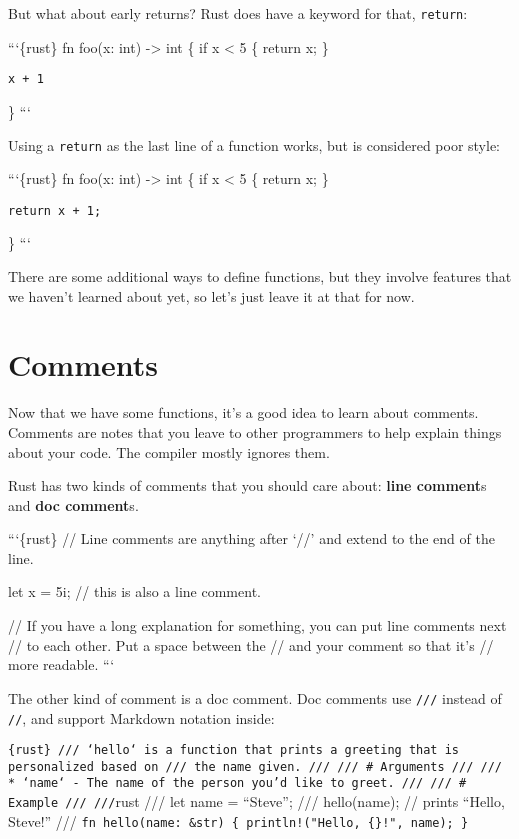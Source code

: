 \documentclass[]{article}
\begin{document}
But what about early returns? Rust does have a keyword for that,
\texttt{return}:

```\{rust\} fn foo(x: int) -\textgreater{} int \{ if x \textless{} 5 \{
return x; \}

\begin{verbatim}
x + 1
\end{verbatim}

\} ```

Using a \texttt{return} as the last line of a function works, but is
considered poor style:

```\{rust\} fn foo(x: int) -\textgreater{} int \{ if x \textless{} 5 \{
return x; \}

\begin{verbatim}
return x + 1;
\end{verbatim}

\} ```

There are some additional ways to define functions, but they involve
features that we haven't learned about yet, so let's just leave it at
that for now.

\section{Comments}\label{comments}

Now that we have some functions, it's a good idea to learn about
comments. Comments are notes that you leave to other programmers to help
explain things about your code. The compiler mostly ignores them.

Rust has two kinds of comments that you should care about: \textbf{line
comment}s and \textbf{doc comment}s.

```\{rust\} // Line comments are anything after `//' and extend to the
end of the line.

let x = 5i; // this is also a line comment.

// If you have a long explanation for something, you can put line
comments next // to each other. Put a space between the // and your
comment so that it's // more readable. ```

The other kind of comment is a doc comment. Doc comments use
\texttt{///} instead of \texttt{//}, and support Markdown notation
inside:

\texttt{\{rust\} /// `hello` is a function that prints a greeting that is personalized based on /// the name given. /// /// \# Arguments /// /// * `name` - The name of the person you'd like to greet. /// /// \# Example /// ///}rust
/// let name = ``Steve''; /// hello(name); // prints ``Hello, Steve!''
///
\texttt{fn hello(name: \&str) \{     println!("Hello, \{\}!", name); \}}
\end{document}
